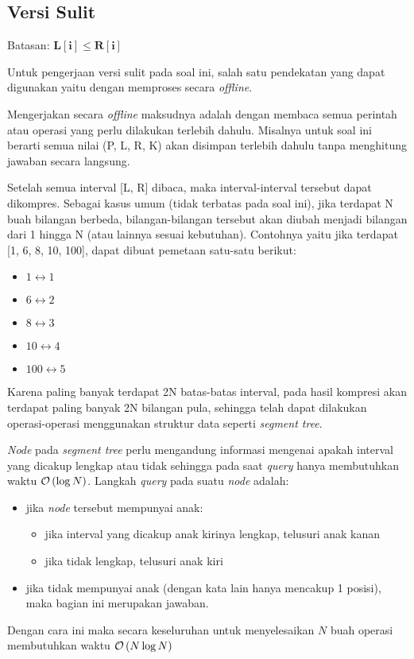 \documentclass[../main_editorial.tex]{subfiles} %
\begin{document}
\subsection*{Versi Sulit}

Batasan: $\mathbf{L[i] \le R[i]}$

Untuk pengerjaan versi sulit pada soal ini, salah satu pendekatan yang dapat digunakan yaitu dengan memproses secara \textit{offline}.

Mengerjakan secara \textit{offline} maksudnya adalah dengan membaca semua perintah atau operasi yang perlu dilakukan terlebih dahulu. Misalnya untuk soal ini berarti semua nilai (P, L, R, K) akan disimpan terlebih dahulu tanpa menghitung jawaban secara langsung.

Setelah semua interval [L, R] dibaca, maka interval-interval tersebut dapat dikompres. Sebagai kasus umum (tidak terbatas pada soal ini), jika terdapat N buah bilangan berbeda, bilangan-bilangan tersebut akan diubah menjadi bilangan dari 1 hingga N (atau lainnya sesuai kebutuhan). Contohnya yaitu jika terdapat [1, 6, 8, 10, 100], dapat dibuat pemetaan satu-satu berikut:
\begin{itemize}
	\item $1 \leftrightarrow 1$
	\item $6 \leftrightarrow 2$
	\item $8 \leftrightarrow 3$
	\item $10 \leftrightarrow 4$
	\item $100 \leftrightarrow 5$
\end{itemize}

Karena paling banyak terdapat 2N batas-batas interval, pada hasil kompresi akan terdapat paling banyak 2N bilangan pula, sehingga telah dapat dilakukan operasi-operasi menggunakan struktur data seperti \textit{segment tree}.

\textit{Node} pada \textit{segment tree} perlu mengandung informasi mengenai apakah interval yang dicakup lengkap atau tidak sehingga pada saat \textit{query} hanya membutuhkan waktu $\mathcal{O}\left( \log N \right)$. Langkah \textit{query} pada suatu \textit{node} adalah:
\begin{itemize}
	\item jika \textit{node} tersebut mempunyai anak:
		\begin{itemize}
			\item jika interval yang dicakup anak kirinya lengkap, telusuri anak kanan
			\item jika tidak lengkap, telusuri anak kiri
		\end{itemize}
	\item jika tidak mempunyai anak (dengan kata lain hanya mencakup 1 posisi), maka bagian ini merupakan jawaban.
\end{itemize}

Dengan cara ini maka secara keseluruhan untuk menyelesaikan $N$ buah operasi membutuhkan waktu $\mathcal{O}\left( N \log N \right)$
\end{document}
